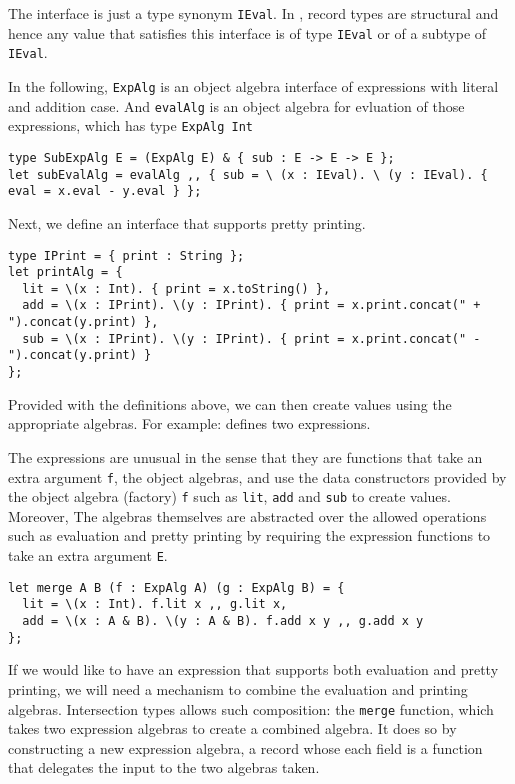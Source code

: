 The interface is just a type synonym \lstinline{IEval}. In \systemFI, record
types are structural and hence any value that satisfies this interface is of
type \lstinline{IEval} or of a subtype of \lstinline{IEval}.

In the following, \lstinline{ExpAlg} is an object algebra interface of
expressions with literal and addition case. And \lstinline{evalAlg} is an object
algebra for evluation of those expressions, which has type \lstinline{ExpAlg Int}

\begin{verbatim}
type SubExpAlg E = (ExpAlg E) & { sub : E -> E -> E };
let subEvalAlg = evalAlg ,, { sub = \ (x : IEval). \ (y : IEval). { eval = x.eval - y.eval } };
\end{verbatim}

Next, we define an interface that supports pretty printing.

\begin{verbatim}
type IPrint = { print : String };
let printAlg = {
  lit = \(x : Int). { print = x.toString() },
  add = \(x : IPrint). \(y : IPrint). { print = x.print.concat(" + ").concat(y.print) },
  sub = \(x : IPrint). \(y : IPrint). { print = x.print.concat(" - ").concat(y.print) }
};
\end{verbatim}

Provided with the definitions above, we can then create values using the
appropriate algebras. For example:
defines two expressions.

The expressions are unusual in the sense that they are functions that take an
extra argument \lstinline{f}, the object algebras, and use the data constructors
provided by the object algebra (factory) \lstinline{f} such as \lstinline{lit},
\lstinline{add} and \lstinline{sub} to create values. Moreover, The algebras
themselves are abstracted over the allowed operations such as evaluation and
pretty printing by requiring the expression functions to take an extra argument
\lstinline{E}.

\begin{verbatim}
let merge A B (f : ExpAlg A) (g : ExpAlg B) = {
  lit = \(x : Int). f.lit x ,, g.lit x,
  add = \(x : A & B). \(y : A & B). f.add x y ,, g.add x y
};
\end{verbatim}

If we would like to have an expression that supports both evaluation and pretty
printing, we will need a mechanism to combine the evaluation and printing
algebras. Intersection types allows such composition: the \lstinline{merge}
function, which takes two expression algebras to create a combined algebra. It
does so by constructing a new expression algebra, a record whose each field is a
function that delegates the input to the two algebras taken.

